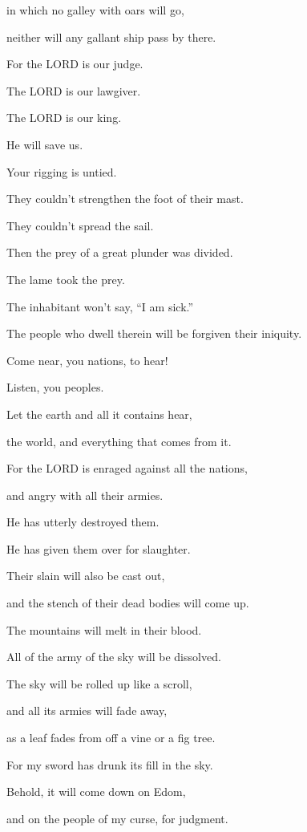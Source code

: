 in which no galley with oars will go,

neither will any gallant ship pass by there.

\myverse{}For the LORD is our judge.

The LORD is our lawgiver.

The LORD is our king.

He will save us.


\vspace{\baselineskip} \myverse{}Your rigging is untied.

They couldn’t strengthen the foot of their mast.

They couldn’t spread the sail.

Then the prey of a great plunder was divided.

The lame took the prey.


\vspace{\baselineskip} \myverse{}The inhabitant won’t say, “I am sick.”

The people who dwell therein will be forgiven their iniquity.


\mychapter{} \myverse*{}Come near, you nations, to hear!

\quad\quad Listen, you peoples.

Let the earth and all it contains hear,

the world, and everything that comes from it.

\myverse{}For the LORD is enraged against all the nations,

and angry with all their armies.

He has utterly destroyed them.

He has given them over for slaughter.

\myverse{}Their slain will also be cast out,

and the stench of their dead bodies will come up.

The mountains will melt in their blood.

\myverse{}All of the army of the sky will be dissolved.

The sky will be rolled up like a scroll,

and all its armies will fade away,

as a leaf fades from off a vine or a fig tree.

\myverse{}For my sword has drunk its fill in the sky.

Behold, it will come down on Edom,

and on the people of my curse, for judgment.

